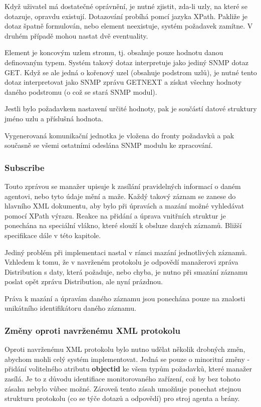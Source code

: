 Když uživatel má dostatečné oprávnění, je nutné zjistit, zda-li uzly, na které se dotazuje, opravdu existují. Dotazování probíhá pomcí jazyka XPath.
Pakliže je dotaz špatně formulován, nebo element neexistuje, systém požadavek zamítne. V druhém případě mohou nastat dvě eventuality.

Element je koncovým uzlem stromu, tj. obsahuje pouze hodnotu danou definovaným typem. Systém takový dotaz interpretuje jako jediný SNMP dotaz GET.
Když se ale jedná o kořenový uzel (obsahuje podstrom uzlů), je nutné tento dotaz interpretovat jako
SNMP zprávu GETNEXT a získat všechny hodnoty daného podstromu (o což se stará SNMP modul).

Jestli bylo požadavkem nastavení určité hodnoty, pak je součástí datové struktury jméno uzlu a příslušná hodnota.

Vygenerovaná komunikační jednotka je vložena do fronty požadavků a pak současně se všemi ostatními odeslána SNMP modulu ke zpracování.

\subsubsection*{Subscribe}
Touto zprávou se manažer upisuje k zasílání pravidelných informací o daném agentovi, nebo tyto údaje mění a maže. Každý takový záznam
se zanese do hlavního XML dokumentu, aby bylo při úpravách a mazání možné vyhledávat pomocí XPath výrazu. Reakce na přidání a úprava
vnitřních struktur je ponechána na speciální vlákno, které slouží k obsluze daných záznamů. Bližší specifikace dále v této kapitole.

Jediný problém při implementaci nastal v rámci mazání jednotlivých záznamů. Vzhledem k tomu, že v navrženém protokolu je odpovědí
manažerovi zpráva Distribution s daty, která požaduje, nebo chyba, je nutno při smazání záznamu poslat opět zprávu Distribution, ale nyní
prázdnou.

Práva k mazání a úpravám daného záznamu jsou ponechána pouze na znalosti unikátního identifikátoru daného záznamu. 


\subsubsection*{Změny oproti navrženému XML protokolu}
Oproti navrženému XML protokolu bylo nutno udělat několik drobných změn, abychom mohli celý systém implementovat. Jedná se pouze o
minoritní změny - přidání volitelného atributu \textbf{objectid} ke všem typům požadavků, které manažer zasílá. Je to z důvodu
identifiace monitorovaného zařízení, což by bez tohoto zásahu nebylo vůbec možné. Zároveň tento zásah umožňuje ponechat stejnou
strukturu protokolu (co se týče dotazů a odpovědí) pro stroj agenta a brány. 

